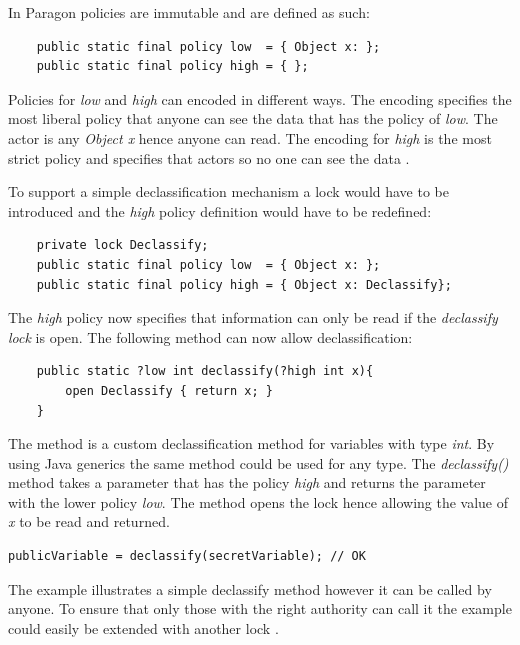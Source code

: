 In Paragon policies are immutable and are defined as such:

\begin{lstlisting}
	public static final policy low  = { Object x: };
	public static final policy high = { };
\end{lstlisting}

Policies for \emph{low} and \emph{high} can encoded in different ways. The encoding specifies the most liberal policy that anyone can see the data that has the policy of \emph{low}. The actor is any \emph{Object x} hence anyone can read. The encoding for \emph{high} is the most strict policy and specifies that actors so no one can see the data \cite{paragonprogramming}.

To support a simple declassification mechanism a lock would have to be introduced and the \emph{high} policy definition would have to be redefined:

\begin{lstlisting}
	private lock Declassify;
	public static final policy low  = { Object x: };
	public static final policy high = { Object x: Declassify};
\end{lstlisting} 

The \emph{high} policy now specifies that information can only be read if the \emph{ declassify lock} is open. The following method can now allow declassification:

\begin{lstlisting}
	public static ?low int declassify(?high int x){
		open Declassify { return x; } 
	}
\end{lstlisting} 

The method is a custom declassification method for variables with type \emph{int}. By using Java generics the same method could be used for any type. The \emph{declassify()} method takes a parameter that has the policy \emph{high} and returns the parameter with the lower policy \emph{low}. The method opens the lock hence allowing the value of \emph{x} to be read and returned. 
 
\begin{lstlisting}
publicVariable = declassify(secretVariable); // OK
\end{lstlisting} 
 
 
The example illustrates a simple declassify method however it can be called by anyone. To ensure that only those with the right authority can call it the example could easily be extended with another lock \cite{paralocks}. 

